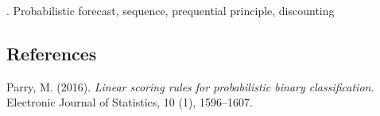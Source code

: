 \documentclass[12pt]{article}
\begin{document}
\vskip 2mm

.
Probabilistic forecast, sequence, prequential principle, discounting


%        
%
%        

\subsection*{References}

\begin{description}

\item Parry, M. (2016). \textit{Linear scoring rules for probabilistic binary classification}. Electronic Journal of Statistics, 10 (1), 1596--1607.




\end{description}
\end{document}
